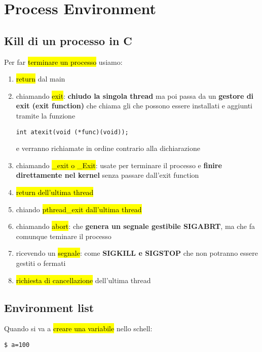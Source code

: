 \newpage
\section{Process Environment}


\subsection{Kill di un processo in C}

Per far \hl{terminare un processo} usiamo:

\begin{enumerate}
    \item \hl{return} dal main
    \item chiamando \hl{exit}: \textbf{chiudo la singola thread} ma poi passa da un \textbf{gestore di exit (exit function)} che chiama gli  che possono essere installati e aggiunti tramite la funzione
\begin{lstlisting}
int atexit(void (*func)(void));
\end{lstlisting}
    e verranno richiamate in ordine contrario alla dichiarazione
    
    \item chiamando \hl{\_exit o \_Exit}: usate per terminare il processo e \textbf{finire direttamente nel kernel} senza passare dall'exit function
    \item \hl{return dell'ultima thread}
    \item chiando \hl{pthread\_exit dall'ultima thread}
    \item chiamando \hl{abort}: che \textbf{genera un segnale gestibile SIGABRT}, ma che fa comunque teminare il processo
    \item ricevendo un \hl{segnale}: come \textbf{SIGKILL e SIGSTOP} che non potranno essere gestiti o fermati
    \item \hl{richiesta di cancellazione} dell'ultima thread
\end{enumerate}


\subsection{Environment list}

Quando si va a \hl{creare una variabile} nello schell:

\begin{lstlisting}
$ a=100
\end{lstlisting}

